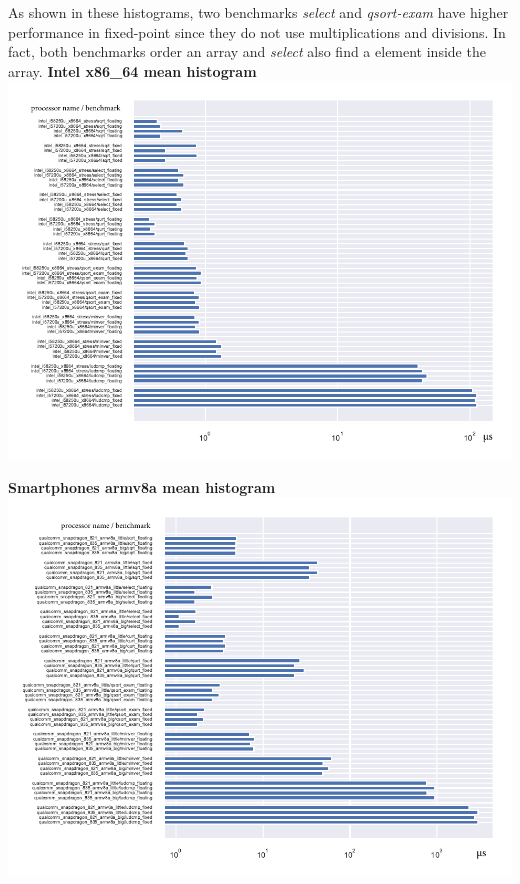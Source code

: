 As shown in these histograms, two benchmarks \textit{select} and \textit{qsort-exam} have higher performance in fixed-point since they do not use multiplications and divisions. In fact, both benchmarks order an array and \textit{select} also find a element inside the array.\newline
\textbf{Intel x86\_64 mean histogram}\newline
\hspace*{-3.2cm}
\includegraphics[width=570pt]{intel_mean_histogram.pdf}
\clearpage

\textbf{Smartphones armv8a mean histogram}\newline
\hspace*{-3.2cm}
\includegraphics[width=570pt]{smartphones_mean_histogram.pdf}
\clearpage

